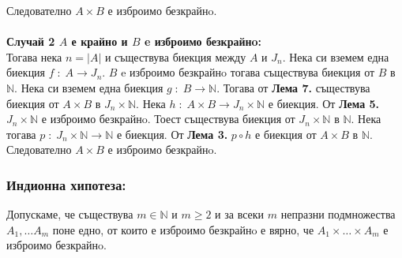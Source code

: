 \documentclass[a4paper, 12pt, oneside]{article}
\newcommand{\N}{\mathbb{N}}
\begin{document}
Следователно \(A \times B\) е изброимо безкрайнo. \\
\hfill \\
\bigskip
\textbf{Случай 2 \(A\) е крайно и \(B\) e изброимо безкрайнo:} \\
Тогава нека \(n = |A|\) и съществува биекция между \(A\) и \(J_n\).
Нека си вземем една биекция \(f \; : \; A \to J_n\).
\(B\) e изброимо безкрайнo тогава съществува биекция от \(B\) в \(\N\).
Нека си вземем една биекция \(g \; : \; B \to \N\).
Тогава от \textbf{Лема 7.} съществува биекция от \(A \times B\) в \(J_n \times \N\).
Нека \(h \; : \; A \times B \to J_n \times \N\) е биекция.
От \textbf{Лема 5.} \(J_n \times \N\) е изброимо безкрайнo.
Тоест съществува биекция от \(J_n\times \N\) в \(\N\).
Нека тогава \(p \; : \; J_n \times \N \to \N\) е биекция.
От \textbf{Лема 3.} \(p \circ h\) е биекция от \(A \times B\) в \(\N\).
Следователно \(A \times B\) е изброимо безкрайнo.
\subsubsection*{Индионна хипотеза:}
Допускаме, че съществува \(m \in \N\) и \(m \geq 2\)
и за всеки \(m\) непразни подмножества \(A_1, \dots A_m\)
поне едно, от които е изброимо безкрайнo е вярно,
че \(A_1 \times \dots \times A_m\) е изброимо безкрайнo. 
\end{document}
